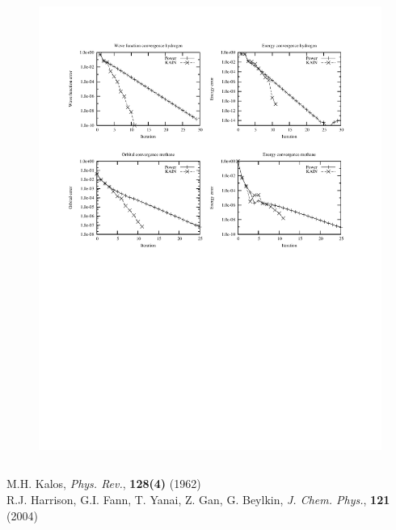 \begin{frame}
\begin{columns}
\begin{column}[b]{0.55\textwidth}
    \begin{figure}
        \includegraphics[scale=0.6, clip, viewport = 50 350 300 540]
        {figures/convergence.pdf}
    \end{figure}

    \end{column}
    \end{columns}
    \centering
    \vspace{2mm}
    \tiny
    M.H. Kalos, 
    {\it Phys. Rev.}, 
    \textbf{128(4)}
    (1962)\\
    R.J. Harrison, G.I. Fann, T. Yanai, Z. Gan, G. Beylkin, 
    {\it J. Chem. Phys.}, 
    \textbf{121}
    (2004)
\end{frame}

